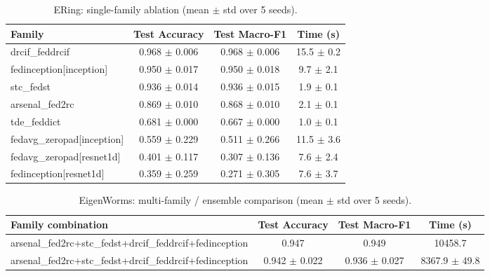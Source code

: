 \begin{table}[t]
\centering
\caption{ERing: single-family ablation (mean $\pm$ std over 5 seeds).}
\label{tab:results_ering_ablation}
\begin{tabular}{lccc}
\toprule
Family & Test Accuracy & Test Macro-F1 & Time (s) \\
\midrule
drcif\_feddrcif & 0.968 $\pm$ 0.006 & 0.968 $\pm$ 0.006 & 15.5 $\pm$ 0.2 \\
fedinception[inception] & 0.950 $\pm$ 0.017 & 0.950 $\pm$ 0.018 & 9.7 $\pm$ 2.1 \\
stc\_fedst & 0.936 $\pm$ 0.014 & 0.936 $\pm$ 0.015 & 1.9 $\pm$ 0.1 \\
arsenal\_fed2rc & 0.869 $\pm$ 0.010 & 0.868 $\pm$ 0.010 & 2.1 $\pm$ 0.1 \\
tde\_feddict & 0.681 $\pm$ 0.000 & 0.667 $\pm$ 0.000 & 1.0 $\pm$ 0.1 \\
fedavg\_zeropad[inception] & 0.559 $\pm$ 0.229 & 0.511 $\pm$ 0.266 & 11.5 $\pm$ 3.6 \\
fedavg\_zeropad[resnet1d] & 0.401 $\pm$ 0.117 & 0.307 $\pm$ 0.136 & 7.6 $\pm$ 2.4 \\
fedinception[resnet1d] & 0.359 $\pm$ 0.259 & 0.271 $\pm$ 0.305 & 7.6 $\pm$ 3.7 \\
\bottomrule
\end{tabular}
\end{table}

\begin{table}[t]
\centering
\caption{EigenWorms: multi-family / ensemble comparison (mean $\pm$ std over 5 seeds).}
\label{tab:results_eigenworms_ensemble}
\begin{tabular}{lccc}
\toprule
Family combination & Test Accuracy & Test Macro-F1 & Time (s) \\
\midrule
arsenal\_fed2rc+stc\_fedst+drcif\_feddrcif+fedinception & 0.947 & 0.949 & 10458.7 \\
arsenal\_fed2rc+stc\_fedst+drcif\_feddrcif+fedinception & 0.942 $\pm$ 0.022 & 0.936 $\pm$ 0.027 & 8367.9 $\pm$ 49.8 \\
\bottomrule
\end{tabular}
\end{table}

